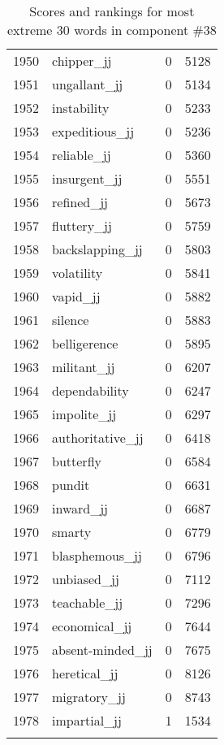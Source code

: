 \begin{longtable}[!htbp]{| rlr@{.}l |}
    1950 & chipper\_jj & 0 & 5128 \\
    1951 & ungallant\_jj & 0 & 5134 \\
    1952 & instability & 0 & 5233 \\
    1953 & expeditious\_jj & 0 & 5236 \\
    1954 & reliable\_jj & 0 & 5360 \\
    1955 & insurgent\_jj & 0 & 5551 \\
    1956 & refined\_jj & 0 & 5673 \\
    1957 & fluttery\_jj & 0 & 5759 \\
    1958 & backslapping\_jj & 0 & 5803 \\
    1959 & volatility & 0 & 5841 \\
    1960 & vapid\_jj & 0 & 5882 \\
    1961 & silence & 0 & 5883 \\
    1962 & belligerence & 0 & 5895 \\
    1963 & militant\_jj & 0 & 6207 \\
    1964 & dependability & 0 & 6247 \\
    1965 & impolite\_jj & 0 & 6297 \\
    1966 & authoritative\_jj & 0 & 6418 \\
    1967 & butterfly & 0 & 6584 \\
    1968 & pundit & 0 & 6631 \\
    1969 & inward\_jj & 0 & 6687 \\
    1970 & smarty & 0 & 6779 \\
    1971 & blasphemous\_jj & 0 & 6796 \\
    1972 & unbiased\_jj & 0 & 7112 \\
    1973 & teachable\_jj & 0 & 7296 \\
    1974 & economical\_jj & 0 & 7644 \\
    1975 & absent-minded\_jj & 0 & 7675 \\
    1976 & heretical\_jj & 0 & 8126 \\
    1977 & migratory\_jj & 0 & 8743 \\
    1978 & impartial\_jj & 1 & 1534 \\
    \hline
    \caption{Scores and rankings for most extreme 30 words in component \#38} \\
\end{longtable}
